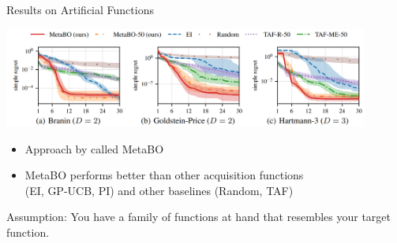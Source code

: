 \begin{frame}[c]{Results on Artificial Functions }

\centering
\includegraphics[width=0.9\textwidth]{images/l2acq_results.png}

\medskip

\begin{itemize}
\item Approach by  called MetaBO
\item MetaBO performs better than other acquisition functions\\ (EI, GP-UCB, PI) and other baselines (Random, TAF)
\end{itemize}

\pause
\begin{flushleft}
\alert{Assumption}: You have a family of functions at hand that resembles your target function.	
\end{flushleft}


\end{frame}



